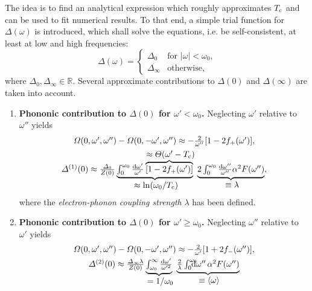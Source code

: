The idea is to find an analytical expression which roughly approximates $T \sb{\text{c}}$ and can be used to fit numerical results. To that end, a simple trial
function for $\Delta(\omega)$ is introduced, which shall solve the
 equations, i.e. be self-consistent, at least at low and high
frequencies:
%
\begin{equation*}
    \Delta(\omega) = \begin{cases}
        \Delta_0 & \text{for $|\omega| < \omega_0$,} \\
        \Delta_\infty & \text{otherwise,}
    \end{cases}
\end{equation*}
%
where $\Delta_0, \Delta_\infty \in \mathds R$. Several approximate contributions
to $\Delta(0)$ and $\Delta(\infty)$ are taken into account.
%
\begin{enumerate}
    \item \textbf{Phononic contribution to \bm$\Delta(0)$ for \bm$\omega' <
    \omega_0$.} Neglecting $\omega'$ relative to $\omega''$ yields
    \begin{gather*}
        \Omega(0, \omega', \omega'') - \Omega(0, -\omega', \omega'')
        \approx -\frac 2 {\omega''} [1 - 2 f_+(\omega')],
        \\
        \Delta^{(1)}(0) \approx \frac{\Delta_0}{Z(0)}
        \hypo
            {\int_0^{\omega_0} \frac{\D \omega'}{\omega'}
            \hyper{[1 - 2 f_+(\omega')]}{\approx \Theta(\omega' - T \sub c)}}
            {\approx \ln(\omega_0 / T \sub c)} \
        \hypo
            {2 \int_0^{\omega_0} \frac{\D \omega''}{\omega''}
            \alpha^2 F(\omega'')}{\equiv \lambda},
    \end{gather*}
    where the \emph{electron-phonon coupling strength} $\lambda$ has been
    defined.
    \item \textbf{Phononic contribution to \bm$\Delta(0)$ for \bm$\omega' \geq
    \omega_0$.} Neglecting $\omega''$ relative to $\omega'$ yields
    \begin{gather*}
        \Omega(0, \omega', \omega'') - \Omega(0, -\omega', \omega'')
        \approx -\frac 2 {\omega'} [1 + 2 f_-(\omega'')],
        \\
        \Delta^{(2)}(0) \approx \frac{\Delta_\infty \lambda}{Z(0)}
        \hypo
            {\int_{\omega_0}^\infty \frac{\D \omega'}{\omega'^2}}
            {= 1 / \omega_0} \
        \hypo
            {\frac 2 \lambda \int \from 0 \till{\omega_0} \D \omega'' \,
            \alpha^2 F(\omega'')}{\equiv \av \omega}

\end{gather*}
\end{enumerate}
